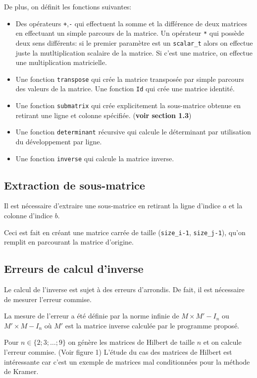\documentclass[a4paper,11pt]{article}
\begin{document}
De plus, on définit les fonctions suivantes:

\begin{itemize}
\item Des opérateurs \texttt{+},\texttt{-} qui effectuent la somme et la différence de deux matrices en effectuant un simple parcours de la matrice. Un opérateur \texttt{*} qui possède deux sens différents: si le premier paramètre est un \texttt{scalar\_t} alors on effectue juste la mutltiplication scalaire de la matrice. Si c'est une matrice, on effectue une multiplication matricielle.
\item Une fonction \texttt{transpose} qui crée la matrice transposée par simple parcours des valeurs de la matrice. Une fonction \texttt{Id} qui crée une matrice identité.
\item Une fonction \texttt{submatrix} qui crée explicitement la sous-matrice obtenue en retirant une ligne et colonne spécifiée. (\textbf{voir section 1.3})
\item Une fonction \texttt{determinant} récursive qui calcule le déterminant par utilisation du développement par ligne.
\item Une fonction \texttt{inverse} qui calcule la matrice inverse.
\end{itemize}

\subsection{Extraction de sous-matrice}

Il est nécessaire d'extraire une sous-matrice en retirant la ligne d'indice $a$ et la colonne d'indice $b$. 

Ceci est fait en créant une matrice carrée de taille (\texttt{size\_i-1}, \texttt{size\_j-1}), qu'on remplit en parcourant la matrice d'origine.

\subsection{Erreurs de calcul d'inverse}

Le calcul de l'inverse est sujet à des erreurs d'arrondis. De fait, il est nécessaire de mesurer l'erreur commise.

La mesure de l'erreur a été définie par la norme infinie de $M\times M' - I_n$ ou $M'\times M - I_n$ où $M'$ est la matrice inverse calculée par le programme proposé.

Pour $n \in \{2;3;\dots;9\}$ on génère les matrices de Hilbert de taille $n$ et on calcule l'erreur commise. (Voir figure 1) L'étude du cas des matrices de Hilbert est intéressante car c'est un exemple de matrices mal conditionnées pour la méthode de Kramer.
\end{document}
